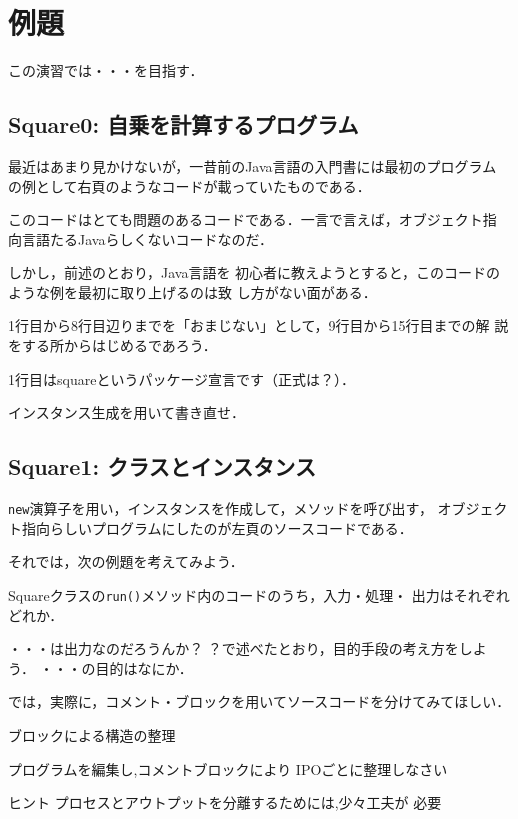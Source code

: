 \documentclass[a4j,papersize]{jsbook}
\begin{document}
\section{例題}

この演習では・・・を目指す．

\newpage
\subsection{Square0: 自乗を計算するプログラム}
最近はあまり見かけないが，一昔前のJava言語の入門書には最初のプログラム
の例として右頁のようなコードが載っていたものである．

このコードはとても問題のあるコードである．一言で言えば，オブジェクト指
向言語たるJavaらしくないコードなのだ．

しかし，前述のとおり，Java言語を
初心者に教えようとすると，このコードのような例を最初に取り上げるのは致
し方がない面がある．

1行目から8行目辺りまでを「おまじない」として，9行目から15行目までの解
説をする所からはじめるであろう．

1行目はsquareというパッケージ宣言です（正式は？）．

\begin{例題}
 インスタンス生成を用いて書き直せ．
\end{例題}

\newpage

\newpage

\subsection{Square1: クラスとインスタンス}

\texttt{new}演算子を用い，インスタンスを作成して，メソッドを呼び出す，
オブジェクト指向らしいプログラムにしたのが左頁のソースコードである．

それでは，次の例題を考えてみよう．

\begin{例題}
 Squareクラスの\texttt{run()}メソッド内のコードのうち，入力・処理・
 出力はそれぞれどれか．
\end{例題}

・・・は出力なのだろうんか？
？で述べたとおり，目的手段の考え方をしよう．
・・・の目的はなにか．

では，実際に，コメント・ブロックを用いてソースコードを分けてみてほしい．

\begin{例題}
ブロックによる構造の整理 

プログラムを編集し,コメントブロックにより
IPOごとに整理しなさい


\end{例題}
 ヒント プロセスとアウトプットを分離するためには,少々工夫が
必要
\end{document}
